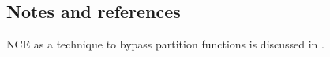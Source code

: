 
\subsection{Notes and references}

NCE as a technique to bypass partition functions is discussed in \textcite{GoodfellowEtAl2016,Prince2023}.


